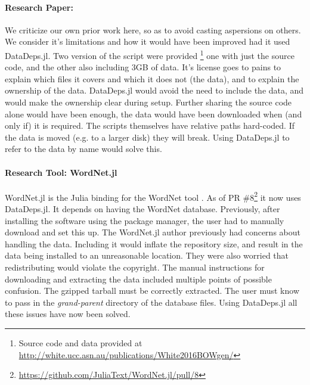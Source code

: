 \documentclass[dvinames]{jors}
\newcommand{\citep}[1]{\parencite{#1}}
\newcommand{\citet}[1]{\textcite{#1}}
\begin{document}
\paragraph{Research Paper: \citet{White2015BOWgen}}
We criticize our own prior work here, so as to avoid casting aspersions on others. We consider it's limitations and how it would have been improved had it used DataDeps.jl.
%
Two version of the script were provided \footnote{Source code and data provided at \url{http://white.ucc.asn.au/publications/White2016BOWgen/}}
one with just the source code, and the other also including 3GB of data.
It's license goes to pains to explain which files it covers and which it does not (the data), and to explain the ownership of the data.
DataDeps.jl would avoid the need to include the data, and would make the ownership clear during setup.
Further sharing the source code alone would have been enough, the data would have been downloaded when  (and only if) it is required.
%
The scripts themselves have relative paths hard-coded. If the data is moved (e.g. to a larger disk) they will break.
Using DataDeps.jl to refer to the data by name would solve this.


\paragraph{Research Tool: WordNet.jl}\label{sec:research-tool-wordnetjl}
WordNet.jl is the Julia binding for the WordNet tool \citep{miller1995wordnet}.
As of PR \#8\footnote{\url{https://github.com/JuliaText/WordNet.jl/pull/8}} it now uses DataDeps.jl.
It depends on having the WordNet database.
Previously, after installing the software using the package manager,
the user had to manually download and set this up.
%
The WordNet.jl author previously had concerns about handling the data.
Including it would inflate the repository size, and result in the data being installed to an unreasonable location.
They were also worried that redistributing would violate the copyright.
%
The manual instructions for downloading and extracting the data included multiple points of possible confusion.
The gzipped tarball must be correctly extracted.
The user must know to pass in the \emph{grand-parent} directory of the database files.
Using DataDeps.jl all these issues have now been solved.
\end{document}
